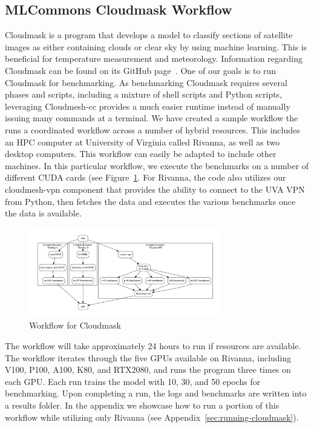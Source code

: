 % 


\subsection{MLCommons Cloudmask Workflow}
\label{cloudmask-workflow}

Cloudmask is a program that develops a model to classify sections of
satellite images as either containing clouds or clear sky by using
machine learning. This is beneficial for temperature measurement and
meteorology. Information regarding Cloudmask can be found on its
GitHub page~\cite{www-cloudmask}. One of our goals is to run
Cloudmask for benchmarking. As benchmarking Cloudmask requires
several phases and scripts, including a mixture of shell scripts and
Python scripts, leveraging Cloudmesh-cc provides a much easier runtime
instead of manually issuing many commands at a terminal. We have
created a sample workflow the runs a coordinated workflow across a
number of hybrid resources. This includes an HPC computer at
University of Virginia called Rivanna, as well as two desktop
computers. This workflow can easily be adapted to include other
machines. In this particular workflow, we execute the benchmarks on a
number of different CUDA cards (see Figure~\ref{fig:cloudmaskwf}. For
Rivanna, the code also utilizes our cloudmesh-vpn component that
provides the ability to connect to the UVA VPN from Python, then
fetches the data and executes the various benchmarks once the data is
available.

\begin{figure}[htb]
\centering
\includegraphics[width=0.75\textwidth]{images/cloudmask-wf.pdf}
\caption{Workflow for Cloudmask}\label{fig:cloudmaskwf}
\end{figure}

The workflow will take approximately 24 hours to run if resources are
available. The workflow iterates through the five GPUs available on
Rivanna, including V100, P100, A100, K80, and RTX2080, and runs the
program three times on each GPU. Each run trains the model with 10,
30, and 50 epochs for benchmarking. Upon completing a run, the logs
and benchmarks are written into a results folder. In the appendix we
showcase how to run a portion of this workflow while utilizing
only Rivanna (see Appendix~\ref{sec:running-cloudmask}).



